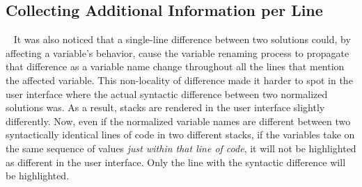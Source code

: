 \subsection{Collecting Additional Information per Line}~\label{subsec:morelineinfo}
It was also noticed that a single-line difference between two solutions could, by affecting a variable's behavior, cause the variable renaming process to propagate that difference as a variable name change throughout all the lines that mention the affected variable. This non-locality of difference made it harder to spot in the user interface where the actual syntactic difference between two normalized solutions was. As a result, stacks are rendered in the user interface slightly differently. Now, even if the normalized variable names are different between two syntactically identical lines of code in two different stacks, if the variables take on the same sequence of values {\it just within that line of code}, it will not be highlighted as different in the user interface. Only the line with the syntactic difference will be highlighted.

